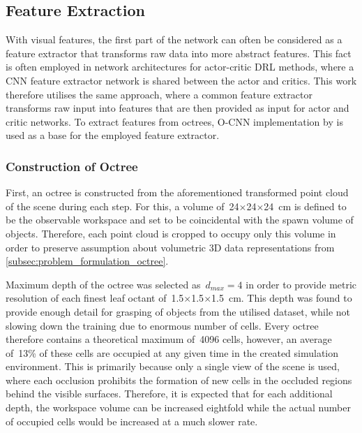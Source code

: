 \subsection{Feature Extraction}\label{subsec:feature_extraction}

With visual features, the first part of the network can often be considered as a feature extractor that transforms raw data into more abstract features. This fact is often employed in network architectures for actor-critic DRL methods, where a CNN feature extractor network is shared between the actor and critics. This work therefore utilises the same approach, where a common feature extractor transforms raw input into features that are then provided as input for actor and critic networks. To extract features from octrees, O-CNN implementation by \citet{wang_o-cnn_2017} is used as a base for the employed feature extractor.


\subsubsection{Construction of Octree}

First, an octree is constructed from the aforementioned transformed point cloud of the scene during each step. For this, a volume of~24\({\times}\)24\({\times}\)24~cm is defined to be the observable workspace and set to be coincidental with the spawn volume of objects. Therefore, each point cloud is cropped to occupy only this volume in order to preserve assumption about volumetric 3D data representations from \autoref{subsec:problem_formulation_octree}.

Maximum depth of the octree was selected as~\(d_{max} = 4\) in order to provide metric resolution of each finest leaf octant of~1.5\({\times}\)1.5\({\times}\)1.5~cm. This depth was found to provide enough detail for grasping of objects from the utilised dataset, while not slowing down the training due to enormous number of cells. Every octree therefore contains a theoretical maximum of~4096 cells, however, an average of~13\% of these cells are occupied at any given time in the created simulation environment. This is primarily because only a single view of the scene is used, where each occlusion prohibits the formation of new cells in the occluded regions behind the visible surfaces. Therefore, it is expected that for each additional depth, the workspace volume can be increased eightfold while the actual number of occupied cells would be increased at a much slower rate.

